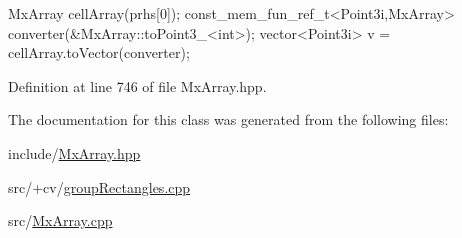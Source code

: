 \begin{DoxyCode}
 MxArray cellArray(prhs[0]);
 const_mem_fun_ref_t<Point3i,MxArray> converter(&MxArray::toPoint3_<int>);
 vector<Point3i> v = cellArray.toVector(converter);
\end{DoxyCode}
 

\-Definition at line 746 of file \-Mx\-Array.\-hpp.



\-The documentation for this class was generated from the following files\-:\begin{DoxyCompactItemize}
\item 
include/\hyperlink{_mx_array_8hpp}{\-Mx\-Array.\-hpp}\item 
src/+cv/\hyperlink{group_rectangles_8cpp}{group\-Rectangles.\-cpp}\item 
src/\hyperlink{_mx_array_8cpp}{\-Mx\-Array.\-cpp}\end{DoxyCompactItemize}
